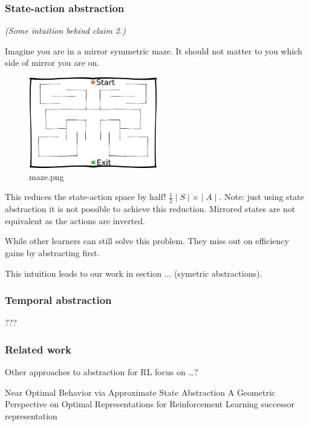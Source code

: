 \subsubsection{State-action abstraction}

\emph{(Some intuition behind claim 2.)}

Imagine you are in a mirror symmetric maze. It should not matter to you
which side of mirror you are on.

\begin{figure}
\centering
\includegraphics[width=0.5\textwidth,height=0.5\textheight]{../../pictures/drawings/maze.png}
\caption{maze.png}
\end{figure}

This reduces the state-action space by half!
\(\frac{1}{2}\mid S \mid \times \mid A \mid\). Note: just using state
abstraction it is not possible to achieve this reduction. Mirrored
states are not equivalent as the actions are inverted.

While other learners can still solve this problem. They miss out on
efficiency gains by abstracting first.

This intuition leads to our work in section ... (symetric abstractions).

\subsubsection{Temporal abstraction}

???


\hypertarget{related-work}{%
\subsubsection{Related work}\label{related-work}}

Other approaches to abstraction for RL focus on \ldots{}?

Near Optimal Behavior via Approximate State Abstraction \cite{Abel2017}
A Geometric Perspective on Optimal Representations for Reinforcement Learning \cite{Bellemare2019b}
successor representation


